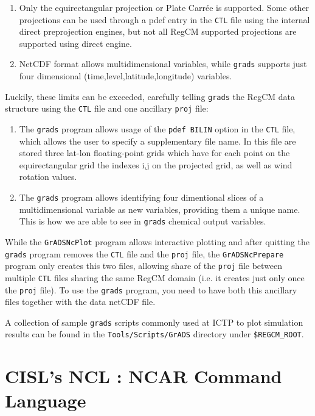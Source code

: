 \begin{enumerate}
\item Only the equirectangular projection or Plate Carr\'ee is supported. Some
other projections can be used through a pdef entry in the \verb=CTL= file
using the internal direct preprojection engines, but not all RegCM supported
projections are supported using direct engine.
\item NetCDF format allows multidimensional variables, while \verb=grads=
supports just four dimensional (time,level,latitude,longitude) variables.
\end{enumerate}

Luckily, these limits can be exceeded, carefully telling \verb=grads= the
RegCM data structure using the \verb=CTL= file and one ancillary \verb=proj=
file:

\begin{enumerate}
\item The \verb=grads= program allows usage of the \verb=pdef BILIN= option
in the \verb=CTL= file, which allows the user to specify a supplementary file
name. In this file are stored three lat-lon floating-point grids which have
for each point on the equirectangular grid the indexes i,j on the projected
grid, as well as wind rotation values.
\item The \verb=grads= program allows identifying four dimentional slices of
a multidimensional variable as new variables, providing them a unique name.
This is how we are able to see in \verb=grads= chemical output variables.
\end{enumerate}

While the \verb=GrADSNcPlot= program allows interactive plotting and after
quitting the \verb=grads= program removes the \verb=CTL= file and the
\verb=proj= file, the \verb=GrADSNcPrepare= program only creates this two
files, allowing share of the \verb=proj= file between multiple \verb=CTL=
files sharing the same RegCM domain (i.e. it creates just only once the
\verb=proj= file). To use the \verb=grads= program, you need to have both
this ancillary files together with the data netCDF file.

A collection of sample \verb=grads= scripts commonly used at ICTP to plot
simulation results can be found in the \verb=Tools/Scripts/GrADS=
directory under \verb=$REGCM_ROOT=.

\section{CISL's NCL : NCAR Command Language}

